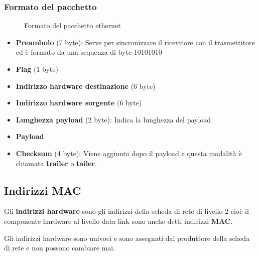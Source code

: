 \documentclass[a4paper]{article}
\begin{document}
\subsubsection{Formato del pacchetto}
\begin{figure}[H]
  \centering
  \caption{Formato del pacchetto ethernet}
\end{figure}
\begin{itemize}
  \item \textbf{Preambolo} (7 byte): Serve per sincronizzare il ricevitore con il trasmettitore
    ed è formato da una sequenza di byte 10101010
  \item \textbf{Flag} (1 byte) 
  \item \textbf{Indirizzo hardware destinazione} (6 byte)
  \item \textbf{Indirizzo hardware sorgente} (6 byte)
  \item \textbf{Lunghezza payload} (2 byte): Indica la lunghezza del payload
  \item \textbf{Payload}
  \item \textbf{Checksum} (4 byte): Viene aggiunto dopo il payload e questa modalità
    è chiamata \textbf{trailer} o \textbf{tailer}.
\end{itemize}

\subsection{Indirizzi MAC}
\begin{definition}
  Gli \textbf{indirizzi hardware} sono gli indirizzi della scheda di rete di livello 2 
  cioè il componente hardware al livello data link sono anche detti indirizzi
  \textbf{MAC}.

  Gli indirizzi hardware sono univoci e sono assegnati dal produttore della scheda
  di rete e non possono cambiare mai.
\end{definition}
\end{document}

